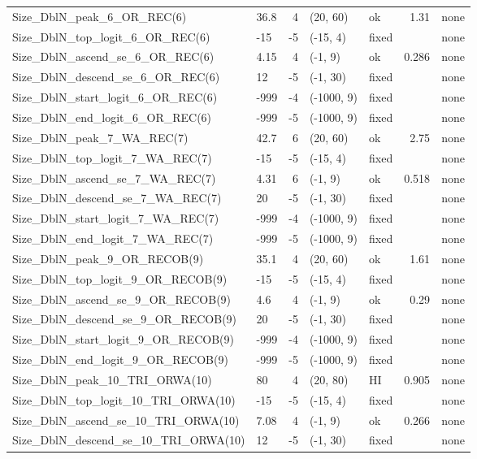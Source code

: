 \documentclass[
]{scrartcl}
\begin{document}
\begin{longtable}{llrllrl}
Size\_DblN\_peak\_6\_OR\_REC(6) & 36.8 & 4 & (20, 60) & ok & 1.31 & none \\ 
Size\_DblN\_top\_logit\_6\_OR\_REC(6) & -15 & -5 & (-15, 4) & fixed &  & none \\ 
Size\_DblN\_ascend\_se\_6\_OR\_REC(6) & 4.15 & 4 & (-1, 9) & ok & 0.286 & none \\ 
Size\_DblN\_descend\_se\_6\_OR\_REC(6) & 12 & -5 & (-1, 30) & fixed &  & none \\ 
Size\_DblN\_start\_logit\_6\_OR\_REC(6) & -999 & -4 & (-1000, 9) & fixed &  & none \\ 
Size\_DblN\_end\_logit\_6\_OR\_REC(6) & -999 & -5 & (-1000, 9) & fixed &  & none \\ 
Size\_DblN\_peak\_7\_WA\_REC(7) & 42.7 & 6 & (20, 60) & ok & 2.75 & none \\ 
Size\_DblN\_top\_logit\_7\_WA\_REC(7) & -15 & -5 & (-15, 4) & fixed &  & none \\ 
Size\_DblN\_ascend\_se\_7\_WA\_REC(7) & 4.31 & 6 & (-1, 9) & ok & 0.518 & none \\ 
Size\_DblN\_descend\_se\_7\_WA\_REC(7) & 20 & -5 & (-1, 30) & fixed &  & none \\ 
Size\_DblN\_start\_logit\_7\_WA\_REC(7) & -999 & -4 & (-1000, 9) & fixed &  & none \\ 
Size\_DblN\_end\_logit\_7\_WA\_REC(7) & -999 & -5 & (-1000, 9) & fixed &  & none \\ 
Size\_DblN\_peak\_9\_OR\_RECOB(9) & 35.1 & 4 & (20, 60) & ok & 1.61 & none \\ 
Size\_DblN\_top\_logit\_9\_OR\_RECOB(9) & -15 & -5 & (-15, 4) & fixed &  & none \\ 
Size\_DblN\_ascend\_se\_9\_OR\_RECOB(9) & 4.6 & 4 & (-1, 9) & ok & 0.29 & none \\ 
Size\_DblN\_descend\_se\_9\_OR\_RECOB(9) & 20 & -5 & (-1, 30) & fixed &  & none \\ 
Size\_DblN\_start\_logit\_9\_OR\_RECOB(9) & -999 & -4 & (-1000, 9) & fixed &  & none \\ 
Size\_DblN\_end\_logit\_9\_OR\_RECOB(9) & -999 & -5 & (-1000, 9) & fixed &  & none \\ 
Size\_DblN\_peak\_10\_TRI\_ORWA(10) & 80 & 4 & (20, 80) & HI & 0.905 & none \\ 
Size\_DblN\_top\_logit\_10\_TRI\_ORWA(10) & -15 & -5 & (-15, 4) & fixed &  & none \\ 
Size\_DblN\_ascend\_se\_10\_TRI\_ORWA(10) & 7.08 & 4 & (-1, 9) & ok & 0.266 & none \\ 
Size\_DblN\_descend\_se\_10\_TRI\_ORWA(10) & 12 & -5 & (-1, 30) & fixed &  & none \\ 

\end{longtable}
\end{document}
